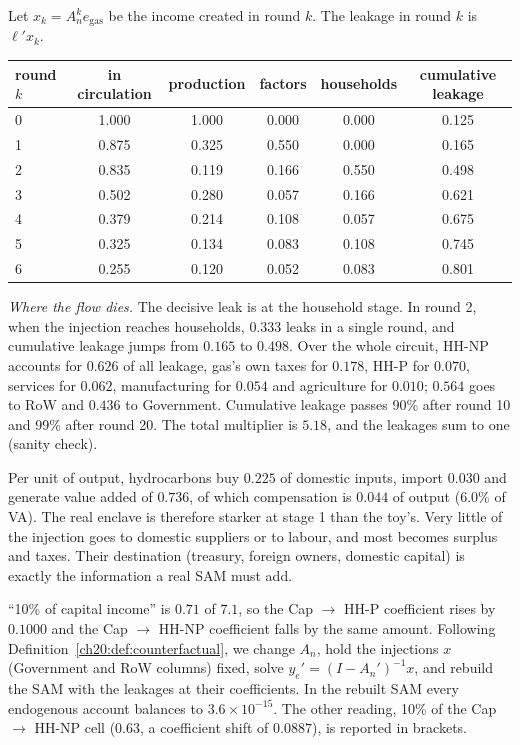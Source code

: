 \documentclass[../solutions_manual.tex]{subfiles}
\begin{document}
 Let $x_k = A_n^k e_{\text{gas}}$ be the income created in round $k$. The leakage in round $k$ is $\ell'x_k$.
\begin{center}\small
\begin{tabular}{lccccc}
\toprule
round $k$ & in circulation & production & factors & households & cumulative leakage \\
\midrule
0 & 1.000 & 1.000 & 0.000 & 0.000 & 0.125 \\
1 & 0.875 & 0.325 & 0.550 & 0.000 & 0.165 \\
2 & 0.835 & 0.119 & 0.166 & 0.550 & 0.498 \\
3 & 0.502 & 0.280 & 0.057 & 0.166 & 0.621 \\
4 & 0.379 & 0.214 & 0.108 & 0.057 & 0.675 \\
5 & 0.325 & 0.134 & 0.083 & 0.108 & 0.745 \\
6 & 0.255 & 0.120 & 0.052 & 0.083 & 0.801 \\
\bottomrule
\end{tabular}
\end{center}
\emph{Where the flow dies.} The decisive leak is at the household stage. In round 2, when the injection reaches households, $0.333$ leaks in a single round, and cumulative leakage jumps from $0.165$ to $0.498$. Over the whole circuit, HH-NP accounts for $0.626$ of all leakage, gas's own taxes for $0.178$, HH-P for $0.070$, services for $0.062$, manufacturing for $0.054$ and agriculture for $0.010$; $0.564$ goes to RoW and $0.436$ to Government. Cumulative leakage passes 90\% after round 10 and 99\% after round 20. The total multiplier is $5.18$, and the leakages sum to one (sanity check).

 Per unit of output, hydrocarbons buy $0.225$ of domestic inputs, import $0.030$ and generate value added of $0.736$, of which compensation is $0.044$ of output ($6.0\%$ of VA). The real enclave is therefore starker at stage 1 than the toy's. Very little of the injection goes to domestic suppliers or to labour, and most becomes surplus and taxes. Their destination (treasury, foreign owners, domestic capital) is exactly the information a real SAM must add.


 ``10\% of capital income'' is $0.71$ of $7.1$, so the Cap $\to$ HH-P coefficient rises by $0.1000$ and the Cap $\to$ HH-NP coefficient falls by the same amount. Following Definition~\ref{ch20:def:counterfactual}, we change $A_n$, hold the injections $x$ (Government and RoW columns) fixed, solve $y_e' = (I - A_n')^{-1}x$, and rebuild the SAM with the leakages at their coefficients. In the rebuilt SAM every endogenous account balances to $3.6\times10^{-15}$. The other reading, 10\% of the Cap $\to$ HH-NP cell ($0.63$, a coefficient shift of $0.0887$), is reported in brackets.
\end{document}
